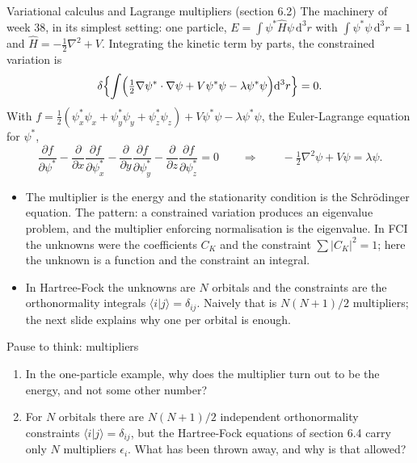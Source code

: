 \documentclass[aspectratio=169,10pt]{beamer}
\newcounter{thinkctr}
\newcommand{\thinkq}[2]{%
  \stepcounter{thinkctr}%
  \begin{tcolorbox}[colback=palewarm,colframe=warm,title={\bfseries Pause to think \#\thethinkctr\hfill\mdseries\small(about #1 min -- discuss with your neighbour)},fonttitle=\bfseries]
  #2
  \end{tcolorbox}}
\newcommand{\braket}[2]{\langle #1\vert #2\rangle}
\newcommand{\dd}{\mathrm{d}}
\begin{document}
\begin{frame}{Variational calculus and Lagrange multipliers (section 6.2)}
  \small
  The machinery of week 38, in its simplest setting: one particle, $E=\int\psi^{*}\hat{H}\psi\,\dd^3r$ with $\int\psi^{*}\psi\,\dd^3r=1$ and $\hat{H}=-\frac12\nabla^2+V$. Integrating the kinetic term by parts, the constrained variation is
  \[
    \delta\Bigl\{\int\Bigl(\tfrac12\nabla\psi^{*}\cdot\nabla\psi+V\psi^{*}\psi-\lambda\psi^{*}\psi\Bigr)\dd^3r\Bigr\}=0 .
  \]
  With $f=\frac12(\psi_x^{*}\psi_x+\psi_y^{*}\psi_y+\psi_z^{*}\psi_z)+V\psi^{*}\psi-\lambda\psi^{*}\psi$, the Euler-Lagrange equation for $\psi^{*}$,
  \[
    \frac{\partial f}{\partial\psi^{*}}-\frac{\partial}{\partial x}\frac{\partial f}{\partial\psi_x^{*}}-\frac{\partial}{\partial y}\frac{\partial f}{\partial\psi_y^{*}}-\frac{\partial}{\partial z}\frac{\partial f}{\partial\psi_z^{*}}=0
    \qquad\Longrightarrow\qquad
    -\tfrac12\nabla^2\psi+V\psi=\lambda\psi .
  \]
  \begin{itemize}
    \item The multiplier is the energy and the stationarity condition is the Schr\"odinger equation. \alert{The pattern}: a constrained variation produces an eigenvalue problem, and the multiplier enforcing normalisation is the eigenvalue. In FCI the unknowns were the coefficients $C_K$ and the constraint $\sum|C_K|^2=1$; here the unknown is a function and the constraint an integral.
    \item In Hartree-Fock the unknowns are $N$ orbitals and the constraints are the orthonormality integrals $\braket{i}{j}=\delta_{ij}$. Naively that is $N(N+1)/2$ multipliers; the next slide explains why one per orbital is enough.
  \end{itemize}
\end{frame}

\begin{frame}{Pause to think: multipliers}
  \thinkq{3}{
  \begin{enumerate}
    \item In the one-particle example, why does the multiplier turn out to be the energy, and not some other number?
    \item For $N$ orbitals there are $N(N+1)/2$ independent orthonormality constraints $\braket{i}{j}=\delta_{ij}$, but the Hartree-Fock equations of section 6.4 carry only $N$ multipliers $\epsilon_i$. What has been thrown away, and why is that allowed?
  \end{enumerate}}
\end{frame}
\end{document}
